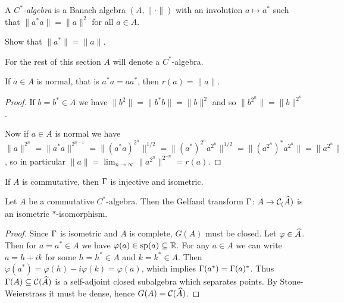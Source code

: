 \begin{definition}
 A \emph{$C^\ast$-algebra} is a Banach algebra $(A,\|\cdot\|)$ with an involution $a\mapsto a^\ast$ such that $\|a^\ast a\|=\|a\|^2$ for all $a\in A$.
\end{definition}
\begin{exercise}
 Show that $\|a^\ast\|=\|a\|$.
\end{exercise}

\noindent For the rest of this section $A$ will denote a $C^\ast$-algebra.

\begin{proposition}
 If $a\in A$ is normal, that is $a^\ast a=aa^\ast$, then $r(a)=\|a\|$.
\end{proposition}
\begin{proof}
 If $b=b^\ast\in A$ we have $\|b^2\|=\|b^\ast b\|=\|b\|^2$ and so $\|b^{2^n}\|=\|b\|^{2^n}$.
 
 \noindent Now if $a\in A$ is normal we have $\|a\|^{2^n}=\|a^\ast a\|^{2^{n-1}}=\|(a^\ast a)^{2^n}\|^{1/2}=\|(a^\ast)^{2^n}a^{2^n}\|^{1/2}=\|(a^{2^n})^\ast a^{2^n}\|=\|a^{2^n}\|$, so in particular $\|a\|=\lim_{n\to\infty}\|a^{2^n}\|^{2^{-n}}=r(a)$.
\end{proof}

\begin{corollary}
 If $A$ is commutative, then $\Gamma$ is injective and isometric.
\end{corollary}
\begin{theorem}\label{thm: Gelfand-Naimark}
 Let $A$ be a commutative $C^\ast$-algebra. Then the Gelfand transform $\Gamma\colon A\to\mathcal{C}_(\widehat{A})$ is an isometric $\ast$-isomorphism.
\end{theorem}
\begin{proof}
 Since $\Gamma$ is isometric and $A$ is complete, $G(A)$ must be closed. Let $\varphi\in\widehat{A}$. Then for $a=a^\ast\in A$ we have $\varphi(a)\in\mathrm{sp}(a)\subseteq\mathbb{R}$. For any $a\in A$ we can write $a=h+ik$ for some $h=h^\ast\in A$ and $k=k^\ast\in A$. Then $\varphi(a^\ast)=\varphi(h)-i\varphi(k)=\varphi(\overline{a})$, which implies $\Gamma(a^\ast)=\Gamma(a)^\ast$. Thus $\Gamma(A)\subseteq\mathcal{C}(\widehat{A})$ is a self-adjoint closed subalgebra which separates points. By Stone-Weierstrass it must be dense, hence $G(A)=\mathcal{C}(\widehat{A})$. 
\end{proof}

